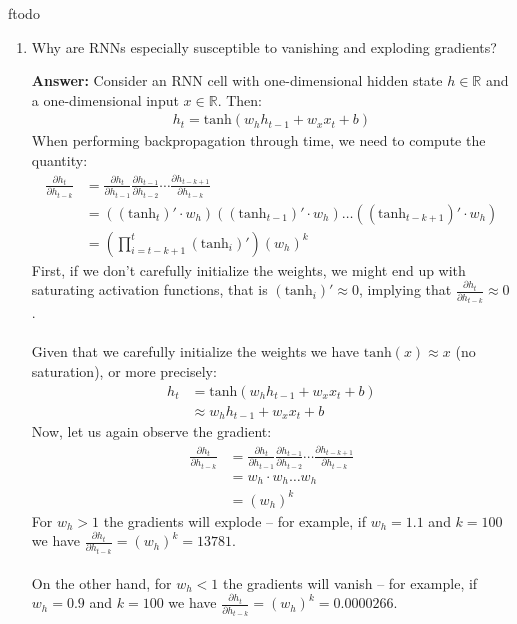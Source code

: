 ƒtodo\documentclass{article}
\newenvironment{QandA}{\begin{enumerate}[label=\arabic*.]}{\end{enumerate}}
\newenvironment{InnerQandA}{\begin{enumerate}[label=\roman*.]}{\end{enumerate}}
\newenvironment{answer}{\par\normalfont \textbf{Answer:}}{}
\newcommand{\R}{\mathbb{R}}
\begin{document}
\begin{QandA}
\begin{InnerQandA}
        \item Why are RNNs especially susceptible to vanishing and exploding gradients?
        \begin{answer}
            Consider an RNN cell with one-dimensional hidden state $h \in \R$ and a one-dimensional input $x \in \R$. Then:
            \begin{align*}
                h_t = \text{tanh} \left(w_h h_{t-1} + w_x x_t + b \right)
            \end{align*}
            When performing backpropagation through time, we need to compute the quantity:
            \begin{align*}
                \frac{\partial h_t}{\partial h_{t-k}} &= \frac{\partial h_t}{\partial h_{t-1}} \frac{\partial h_{t-1}}{\partial h_{t-2}} \cdots \frac{\partial h_{t-k+1}}{\partial h_{t-k}} \\
                &= \left( (\text{tanh}_t)' \cdot w_h \right) \left( (\text{tanh}_{t-1})' \cdot w_h \right) \ldots \left( (\text{tanh}_{t-k+1})' \cdot w_h \right) \\
                &= \left(\prod_{i=t-k+1}^t (\text{tanh}_{i})' \right) (w_h)^k  
            \end{align*}
            First, if we don't carefully initialize the weights, we might end up with saturating activation functions, that is $(\text{tanh}_i)' \approx 0$, implying that $\frac{\partial h_t}{\partial h_{t-k}} \approx 0 $. \\\\
            Given that we carefully initialize the weights we have $\text{tanh}(x) \approx x$ (no saturation), or more precisely:
            \begin{align*}
                h_t &= \text{tanh} \left(w_h h_{t-1} + w_x x_t + b \right) \\
                &\approx w_h h_{t-1} + w_x x_t + b
            \end{align*}
            Now, let us again observe the gradient:
            \begin{align*}
                \frac{\partial h_t}{\partial h_{t-k}} &= \frac{\partial h_t}{\partial h_{t-1}} \frac{\partial h_{t-1}}{\partial h_{t-2}} \cdots \frac{\partial h_{t-k+1}}{\partial h_{t-k}} \\
                &= w_h \cdot w_h \ldots  w_h \\
                &= (w_h)^k  
            \end{align*}
            For $w_h > 1$ the gradients will explode -- for example, if $w_h = 1.1$ and $k = 100$ we have $\frac{\partial h_t}{\partial h_{t-k}} = (w_h)^k = 13781$. \\\\
            On the other hand, for $w_h < 1$ the gradients will vanish -- for example, if $w_h = 0.9$ and $k = 100$ we have $\frac{\partial h_t}{\partial h_{t-k}} = (w_h)^k = 0.0000266$.
        \end{answer}
    \end{InnerQandA}


\end{QandA}
\end{document}
